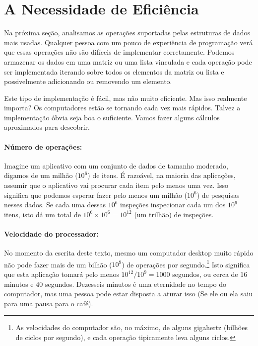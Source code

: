 \section{A Necessidade de Eficiência}

Na próxima seção, analisamos as operações suportadas pelas estruturas de dados
mais usadas. Qualquer pessoa com um pouco de experiência de programação verá que
essas operações não são difíceis de implementar corretamente. Podemos armazenar
os dados em uma matriz ou uma lista vinculada e cada operação pode ser
implementada iterando sobre todos os elementos da matriz ou lista e
possivelmente adicionando ou removendo um elemento.

Este tipo de implementação é fácil, mas não muito eficiente. Mas isso realmente
importa? Os computadores estão se tornando cada vez mais rápidos. Talvez a
implementação óbvia seja boa o suficiente. Vamos fazer alguns cálculos
aproximados para descobrir.

\paragraph{Número de operações:}  Imagine um aplicativo com um conjunto de dados
de tamanho moderado, digamos de um milhão ($10^6$) de itens. É razoável, na
maioria das aplicações, assumir que o aplicativo vai procurar cada item pelo
menos uma vez. Isso significa que podemos esperar fazer pelo menos um milhão
($10^6$) de pesquisas nesses dados. Se cada uma dessas $10^6$ inspeções 
inspecionar cada um dos $10^6$ itens, isto dá um total de
$10^6\times10^6=10^{12}$ (um trilhão) de inspeções.

\paragraph{Velocidade do processador:} No momento da escrita deste texto, mesmo
um computador desktop muito rápido não pode fazer mais de um bilhão ($10^9$) de
operações por segundo.\footnote{As velocidades do computador são, no máximo, de
	alguns gigahertz (bilhões de ciclos por segundo), e cada operação tipicamente
	leva alguns ciclos.}
Isto significa que esta aplicação tomará pelo menos $10^{12}/10^9=1000$
segundos, ou cerca de 16 minutos e 40 segundos. Dezesseis minutos é uma
eternidade no tempo do computador, mas uma pessoa pode estar disposta a aturar
isso (Se ele ou ela saiu para uma pausa para o café).


